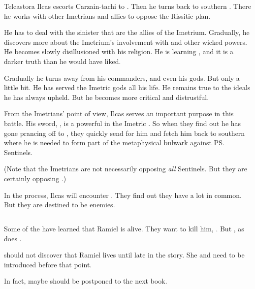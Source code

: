 \begin{garbage}
Telcastora Ilcas escorts Carzain-tachi to \Redce. 
Then he turns back to southern \Velcad. 
There he works with other Imetrians and allies to oppose the Rissitic plan. 

He has to deal with the sinister \nagae{} that are the allies of the Imetrium. 
Gradually, he discovers more about the Imetrium's involvement with \nagae{} and other wicked powers. 
He becomes slowly disillusioned with his religion. 
He is learning , and it is a darker truth than he would have liked. 

Gradually he turns away from his commanders, and even his gods. 
But only a little bit. 
He has served the Imetric gods all his life. 
He remains true to the ideals he has always upheld. 
But he becomes more critical and distrustful. 

From the Imetrians' point of view, Ilcas serves an important purpose in this battle. 
His sword, \Telderain, is a powerful \vertex{} in the Imetric \matrix. 
So when they find out he has gone prancing off to \Redce, they quickly send for him and fetch him back to southern \Velcad{} where he is needed to form part of the metaphysical bulwark against \ps{\Secherdamon} Sentinels. 

(Note that the Imetrians are not necessarily opposing \emph{all} Sentinels. But they are certainly opposing \Secherdamon.) 

In the process, Ilcas will encounter \Narkiza. 
They find out they have a lot in common. 
But they are destined to be enemies. 









\subsection{\Mystraacht}
Some of the \Mystraacht{} have learned that Ramiel is alive. 
They want to kill him, . 
But , as does \Cishiel{}. 

\Cishiel{} should not discover that Ramiel lives until late in the story. 
She and \Dasteron{} need to be introduced before that point. 

In fact, maybe \Cishiel{} should be postponed to the next book. 










\end{garbage}
